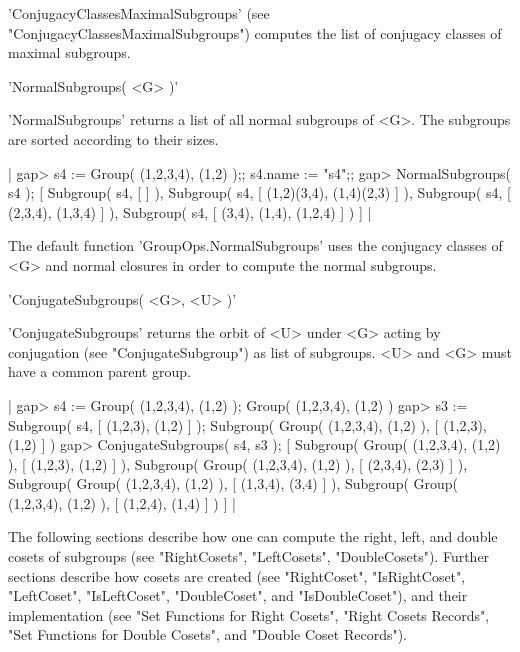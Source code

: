 'ConjugacyClassesMaximalSubgroups' (see
"ConjugacyClassesMaximalSubgroups") computes the list of conjugacy
classes of maximal subgroups.


'NormalSubgroups( <G> )'

'NormalSubgroups'  returns  a list of all normal subgroups  of <G>.   The
subgroups are sorted according to their sizes.

|    gap> s4 := Group( (1,2,3,4), (1,2) );; s4.name := "s4";;
    gap> NormalSubgroups( s4 );
    [ Subgroup( s4, [  ] ), Subgroup( s4, [ (1,2)(3,4), (1,4)(2,3) ] ),
      Subgroup( s4, [ (2,3,4), (1,3,4) ] ), 
      Subgroup( s4, [ (3,4), (1,4), (1,2,4) ] ) ] |

The  default   function  'GroupOps.NormalSubgroups'  uses  the  conjugacy
classes of  <G>  and  normal  closures in order  to  compute  the  normal
subgroups.


'ConjugateSubgroups( <G>, <U> )'

'ConjugateSubgroups' returns   the orbit   of <U>   under  <G> acting  by
conjugation (see "ConjugateSubgroup") as  list of subgroups.  <U> and <G>
must have a common parent group.

|    gap> s4 := Group( (1,2,3,4), (1,2) );
    Group( (1,2,3,4), (1,2) )
    gap> s3 := Subgroup( s4, [ (1,2,3), (1,2) ] );
    Subgroup( Group( (1,2,3,4), (1,2) ), [ (1,2,3), (1,2) ] )
    gap> ConjugateSubgroups( s4, s3 );
    [ Subgroup( Group( (1,2,3,4), (1,2) ), [ (1,2,3), (1,2) ] ), 
      Subgroup( Group( (1,2,3,4), (1,2) ), [ (2,3,4), (2,3) ] ), 
      Subgroup( Group( (1,2,3,4), (1,2) ), [ (1,3,4), (3,4) ] ), 
      Subgroup( Group( (1,2,3,4), (1,2) ), [ (1,2,4), (1,4) ] ) ] |


%

The following sections  describe how one can compute the right, left, and
double   cosets   of   subgroups   (see    "RightCosets",   "LeftCosets",
"DoubleCosets").  Further sections  describe how cosets are created  (see
"RightCoset", "IsRightCoset", "LeftCoset", "IsLeftCoset",  "DoubleCoset",
and "IsDoubleCoset"),  and their implementation   (see "Set Functions for
Right Cosets", "Right Cosets Records", "Set Functions for Double Cosets",
and "Double Coset Records").

